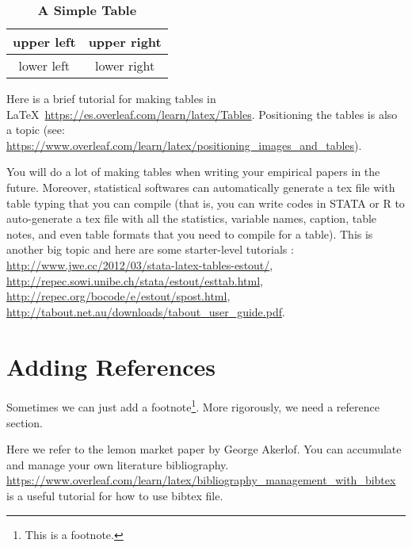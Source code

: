 \documentclass[10pt]{extarticle}
\theoremstyle{theorem}
\theoremstyle{lemma}
\theoremstyle{proposition}
\theoremstyle{corollary}
\theoremstyle{assumption}
\theoremstyle{model}
\theoremstyle{property}
\theoremstyle{example}
\theoremstyle{algorithm}
\theoremstyle{definition}
\theoremstyle{axiom}
\theoremstyle{remark}
\begin{document}
\begin{table}[H]
\begin{center}
\caption*{\textbf{A Simple Table}}
\begin{tabular}{c|c}
\hline\hline
upper left & upper right \\
\hline
lower left & lower right \\
\hline\hline
\end{tabular}
\end{center}
\end{table}

Here is a brief tutorial for making tables in \LaTeX \ \href{https://es.overleaf.com/learn/latex/Tables}{https://es.overleaf.com/learn/latex/Tables}. Positioning the tables is also a topic (see: \href{https://www.overleaf.com/learn/latex/positioning\_images\_and\_tables}{https://www.overleaf.com/learn/latex/positioning\_images\_and\_tables}).

You will do a lot of making tables when writing your empirical papers in the future. Moreover, statistical softwares can automatically generate a tex file with table typing that you can compile (that is, you can write codes in STATA or R to auto-generate a tex file with all the statistics, variable names, caption, table notes, and even table formats that you need to compile for a table). This is another big topic and here are some starter-level tutorials : \href{http://www.jwe.cc/2012/03/stata-latex-tables-estout/}{http://www.jwe.cc/2012/03/stata-latex-tables-estout/}, \href{http://repec.sowi.unibe.ch/stata/estout/esttab.html}{http://repec.sowi.unibe.ch/stata/estout/esttab.html}, \href{http://repec.org/bocode/e/estout/spost.html}{http://repec.org/bocode/e/estout/spost.html}, \href{http://tabout.net.au/downloads/tabout\_user\_guide.pdf}{http://tabout.net.au/downloads/tabout\_user\_guide.pdf}.


\section{Adding References}

Sometimes we can just add a footnote\footnote{This is a footnote.}. More rigorously, we need a reference section. 

Here we refer to the lemon market paper by George Akerlof\cite{akerlof1978market}. You can accumulate and manage your own literature bibliography. \href{https://www.overleaf.com/learn/latex/bibliography\_management\_with\_bibtex}{https://www.overleaf.com/learn/latex/bibliography\_management\_with\_bibtex} is a useful tutorial for how to use bibtex file.
\end{document}
